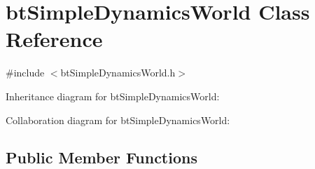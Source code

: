 \hypertarget{classbt_simple_dynamics_world}{\section{bt\+Simple\+Dynamics\+World Class Reference}
\label{classbt_simple_dynamics_world}
}


{\ttfamily \#include $<$bt\+Simple\+Dynamics\+World.\+h$>$}



Inheritance diagram for bt\+Simple\+Dynamics\+World\+:


Collaboration diagram for bt\+Simple\+Dynamics\+World\+:
\subsection*{Public Member Functions}
